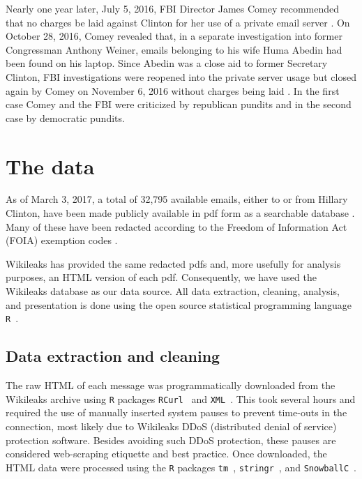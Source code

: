 \documentclass[journal]{vgtc}                %
\begin{document}
Nearly one year later, July 5, 2016,  FBI Director James Comey recommended that no charges be laid against Clinton for her use of a private email server \cite{nochargeFBI}.  On October 28, 2016, Comey revealed that, in a separate investigation into former Congressman Anthony Weiner, emails belonging to his wife Huma Abedin had been found on his laptop.  Since Abedin was a close aid to former Secretary Clinton, FBI investigations were reopened into the private server usage but closed again by Comey on November 6, 2016 without charges being laid \cite{nochargeFBINov}.  In the first case Comey and the FBI were criticized by republican pundits and in the second case by democratic pundits. 

\section{The data}
\label{sect:data}
As of March 3, 2017, a total of 32,795 available emails, either to or from Hillary Clinton, have been made publicly available in pdf form as a searchable database \cite{StateDeptFOIA}.  Many of these have been redacted according to the Freedom of Information Act (FOIA) exemption codes \cite{FOIA}.  

Wikileaks \cite{Wikileaks} has provided the same redacted pdfs and, more usefully for analysis purposes, an HTML version of each pdf.  Consequently, we have used the Wikileaks database as our data source.   All data extraction, cleaning, analysis, and presentation is done using the open source statistical programming language \texttt{R}~\cite{Rsystem}.

\subsection{Data extraction and cleaning}
\label{sect:data:extrclean}
The raw HTML of each message was programmatically downloaded from the Wikileaks archive using \texttt{R} packages  \texttt{RCurl}~\cite{RCurl2016package} and \texttt{XML}~\cite{XML2016package}.  This took several hours and required the use of manually inserted system pauses to prevent time-outs in the connection, most likely due to Wikileaks DDoS (distributed denial of service) protection software. Besides avoiding such DDoS protection, these pauses are considered web-scraping etiquette and best practice.
Once downloaded, the HTML data were processed using the \texttt{R} packages \texttt{tm}~\cite{tm2008paper, tm2017package}, \texttt{stringr}~\cite{stringr2016package}, and \texttt{SnowballC}~\cite{snowballc2014package}.   
\end{document}
